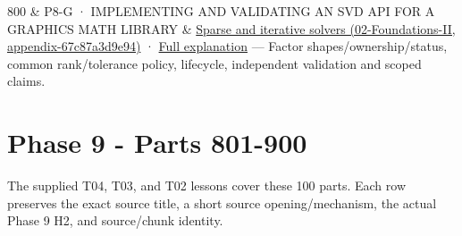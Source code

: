 {\begin{longtable}[]
800 & P8-G · IMPLEMENTING AND VALIDATING AN SVD API FOR A GRAPHICS MATH LIBRARY & \href{../02-Foundations-II/main.pdf\#nameddest=appendix-67c87a3d9e94}{Sparse and iterative solvers (02-Foundations-II, appendix-67c87a3d9e94)} · \href{Continuous\%20Notes/Computing\%20Foundations\%20-\%20From\%20Bits\%20to\%20C++\%20and\%20Systems\%20APIs\#An\%20SVD\%20API\%20begins\%20with\%20shapes\%20and\%20guarantees/}{Full explanation} --- Factor shapes/ownership/status, common rank/tolerance policy, lifecycle, independent validation and scoped claims. \\
\end{longtable}
}

\section{Phase 9 - Parts 801-900}\label{appendix-fd090d982a15-phase-9---parts-801-900}

The supplied T04, T03, and T02 lessons cover these 100 parts. Each row preserves the exact source title, a short source opening/mechanism, the actual Phase 9 H2, and source/chunk identity.

